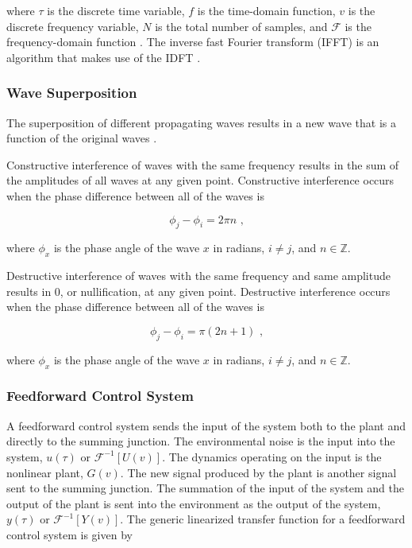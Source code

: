 \documentclass[11pt, letterpaper]{article}
\numberwithin{equation}{section}
\begin{document}
where $\tau$ is the discrete time variable, $f$ is the time-domain function, $v$ is the discrete frequency variable, $N$ is the total number of samples, and $\mathcal{F}$ is the frequency-domain function \cite{bracewell}. The inverse fast Fourier transform (IFFT) is an algorithm that makes use of the IDFT \cite{bracewell}.

\subsubsection{Wave Superposition}

The superposition of different propagating waves results in a new wave that is a function of the original waves \cite{roy}.

Constructive interference of waves with the same frequency results in the sum of the amplitudes of all waves at any given point. Constructive interference occurs when the phase difference between all of the waves is

\begin{equation}
    \phi_j - \phi_i = 2 \pi n \text{ ,}
\end{equation}

where $\phi_x$ is the phase angle of the wave $x$ in radians, $i \neq j$, and $n \in \mathbb{Z}$.

Destructive interference of waves with the same frequency and same amplitude results in $0$, or nullification, at any given point. Destructive interference occurs when the phase difference between all of the waves is

\begin{equation}
    \phi_j - \phi_i = \pi (2n + 1) \text{ ,}
\end{equation}

where $\phi_x$ is the phase angle of the wave $x$ in radians, $i \neq j$, and $n \in \mathbb{Z}$.

\pagebreak

\subsubsection{Feedforward Control System}

A feedforward control system sends the input of the system both to the plant and directly to the summing junction. The environmental noise is the input into the system, $u(\tau)$ or $\mathcal{F}^{-1}[U(v)]$. The dynamics operating on the input is the nonlinear plant, $G(v)$. The new signal produced by the plant is another signal sent to the summing junction. The summation of the input of the system and the output of the plant is sent into the environment as the output of the system, $y(\tau)$ or $\mathcal{F}^{-1}[Y(v)]$. The generic linearized transfer function for a feedforward control system is given by
\end{document}
